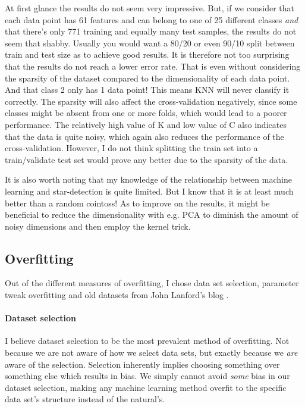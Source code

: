 \documentclass{article}
\theoremstyle{plain}
\theoremstyle{nonumberplain}
\begin{document}
At first glance the results do not seem very impressive.
But, if we consider that each data point has 61 features and can belong to one of 25 different classes \textit{and} that there's only 771 training and equally many test samples, the results do not seem that shabby. 
Usually you would want a 80/20 or even 90/10 split between train and test size as to achieve good results.
It is therefore not too surprising that the results do not reach a lower error rate.
That is even without considering the sparsity of the dataset compared to the dimensionality of each data point.
And that class 2 only has 1 data point! This means KNN will never classify it correctly. 
The sparsity will also affect the cross-validation negatively, since some classes might be absent from one or more folds, which would lead to a poorer performance. 
The relatively high value of K and low value of C also indicates that the data is quite noisy, which again also reduces the performance of the cross-validation.
However, I do not think splitting the train set into a train/validate test set would prove any better due to the sparsity of the data.

It is also worth noting that my knowledge of the relationship between machine learning and star-detection is quite limited.
But I know that it is at least much better than a random cointoss! 
As to improve on the results, it might be beneficial to reduce the dimensionality with e.g. PCA to diminish the amount of noisy dimensions and then employ the kernel trick.

\subsection{Overfitting}

Out of the different measures of overfitting, I chose data set selection, parameter tweak overfitting and old datasets from John Lanford's blog \cite{webiste:blog}.

\paragraph{Dataset selection} I believe dataset selection to be the most prevalent method of overfitting. 
Not because we are not aware of how we select data sets, but exactly because we \textit{are} aware of the selection. 
Selection inherently implies choosing something over something else which results in bias.
We simply cannot avoid \textit{some} bias in our dataset selection, making any machine learning method overfit to the specific data set's structure instead of the natural's.
\end{document}
